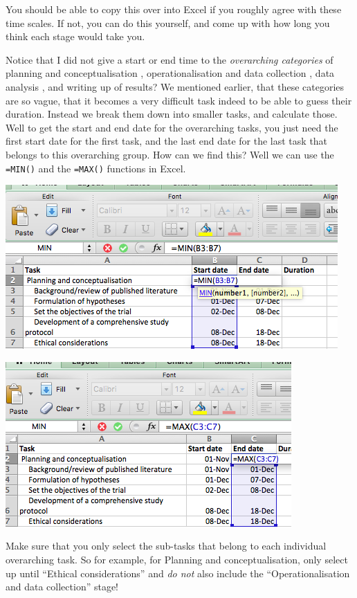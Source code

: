 \documentclass[]{book}
\theoremstyle{definition}
\theoremstyle{definition}
\theoremstyle{definition}
\theoremstyle{remark}
\begin{document}
You should be able to copy this over into Excel if you roughly agree
with these time scales. If not, you can do this yourself, and come up
with how long you think each stage would take you.

Notice that I did not give a start or end time to the \emph{overarching
categories} of planning and conceptualisation , operationalisation and
data collection , data analysis , and writing up of results? We
mentioned earlier, that these categories are so vague, that it becomes a
very difficult task indeed to be able to guess their duration. Instead
we break them down into smaller tasks, and calculate those. Well to get
the start and end date for the overarching tasks, you just need the
first start date for the first task, and the last end date for the last
task that belongs to this overarching group. How can we find this? Well
we can use the \texttt{=MIN()} and the \texttt{=MAX()} functions in
Excel.

\includegraphics{imgs/ gantt_min.png}

\includegraphics{imgs/gantt_max.png}

Make sure that you only select the sub-tasks that belong to each
individual overarching task. So for example, for Planning and
conceptualisation, only select up until ``Ethical considerations'' and
\emph{do not} also include the ``Operationalisation and data
collection'' stage!
\end{document}
